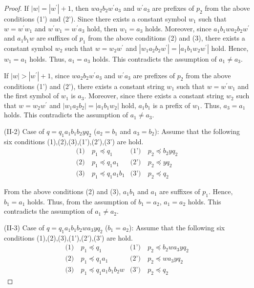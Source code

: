 \begin{proof}
If $|w|=|w^{\prime}|+1$, then $wa_{2}b_{2}w^{\prime}a_{3}$ and $w^{\prime}a_{3}$ are prefixes of $p_{2}$ from the above conditions (1') and (2').
Since there exists a constant symbol $w_{1}$ such that $w=w^{\prime}w_{1}$ and $w^{\prime}w_{1}=w^{\prime}a_{3}$ hold, then $w_{1}=a_{3}$ holds.
Moreover, since $a_{1}b_{1}wa_{2}b_{2}w^{\prime}$ and $a_{1}b_{1}w$ are suffixes of $p_{1}$ from the above conditions (2) and (3), 
there exists a constant symbol $w_{2}$ such that $w=w_{2}w^{\prime}$ and $|w_{1}a_{2}b_{2}w^{\prime}|=|a_{1}b_{1}w_{2}w^{\prime}|$ hold.
Hence, $w_{1}=a_{1}$ holds.
Thus, $a_{1}=a_{3}$ holds.
This contradicts the assumption of $a_{1}\ne a_{3}$.

If $|w| > |w^{\prime}|+1$, since $wa_{2}b_{2}w^{\prime}a_{3}$ and $w^{\prime}a_{3}$ are prefixes of $p_{2}$ from the above conditions (1') and (2'),
there exists a constant string $w_{1}$ such that $w=w^{\prime}w_{1}$ and the first symbol of $w_{1}$ is $a_{3}$.
Moreover, since there exists a constant string $w_{2}$ such that $w=w_{2}w^{\prime}$ and $|w_{1}a_{2}b_{2}|=|a_{1}b_{1}w_{2}|$ hold,
$a_{1}b_{1}$ is a prefix of $w_{1}$.
Thus, $a_{3}=a_{1}$ holds.
This contradicts the assumption of $a_{1} \ne a_{3}$.
\smallskip

\noindent
(II-2) Case of $q=q_{1}a_{1}b_{1}b_{2}yq_{2}$ ($a_{2}=b_{1}$ and $a_{3}=b_{2}$):
Assume that the following six conditions (1),(2),(3),(1'),(2'),(3') are hold.
\begin{align*}
\textrm{(1)}~& p_{1} \preceq q_{1} & \textrm{(1')}~& p_{2} \preceq b_{2}yq_{2} \\
\textrm{(2)}~& p_{1} \preceq q_{1}a_{1} & \textrm{(2')}~& p_{2} \preceq yq_{2} \\
\textrm{(3)}~& p_{1} \preceq q_{1}a_{1}b_{1} & \textrm{(3')}~& p_{2} \preceq q_{2}
\end{align*}

\noindent
From the above conditions (2) and (3), $a_{1}b_{1}$ and $a_{1}$ are suffixes of $p_{1}$.
Hence, $b_{1}=a_{1}$ holds.
Thus, from the assumption of $b_{1}=a_{2}$, $a_{1}=a_{2}$ holds.
This contradicts the assumption of $a_{1} \ne a_{2}$.
\smallskip

\noindent
(II-3) Case of $q=q_{1}a_{1}b_{1}b_{2}wa_{3}yq_{2}$ ($b_{1}=a_{2}$):
Assume that the following six conditions (1),(2),(3),(1'),(2'),(3') are hold.
\begin{align*}
\textrm{(1)}~& p_{1} \preceq q_{1} & \textrm{(1')}~& p_{2} \preceq b_{2}wa_{3}yq_{2} \\
\textrm{(2)}~& p_{1} \preceq q_{1}a_{1} & \textrm{(2')}~& p_{2} \preceq wa_{3}yq_{2} \\
\textrm{(3)}~& p_{1} \preceq q_{1}a_{1}b_{1}b_{2}w & \textrm{(3')}~& p_{2} \preceq q_{2}
\end{align*}


\end{proof}
